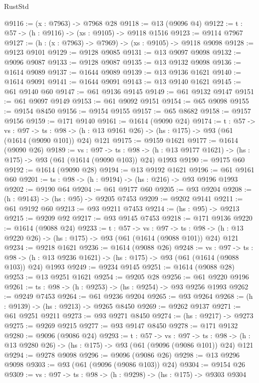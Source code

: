 \begin{lexlean}{RustStd}
\begin{coremodule}
@9116 := (x : @7963) -> @7968 @28
@9118 := @13 (@9096 @4)
@9122 := {t : @57} -> (h : @9116) -> (xs : @9105) -> @9118 @1516
@9123 := @9114 @7967
@9127 := (h : (x : @7963) -> @7969) -> (xs : @9105) -> @9118 @9098
@9128 := @9123 @9101
@9129 := @9128 @9085
@9131 := @13 @9097 @9098
@9132 := @9096 @9087
@9133 := @9128 @9087
@9135 := @13 @9132 @9098
@9136 := @1614 @9089
@9137 := @1644 @9089
@9139 := @13 @9136 @1621
@9140 := @1614 @9091
@9141 := @1644 @9091
@9143 := @13 @9140 @1621
@9145 := @61 @9140 @60
@9147 := @61 @9136 @9145
@9149 := @61 @9132 @9147
@9151 := @61 @9097 @9149
@9153 := @61 @9092 @9151
@9154 := @65 @9098
@9155 := @9154 @8450
@9156 := @9154 @9155
@9157 := @65 @8682
@9158 := @9157 @9156
@9159 := @171 @9140
@9161 := @1614 (@9090 @24)
@9174 := {t : @57} ->
  {vs : @97} ->
  {ts : @98} -> (h : @13 @9161 @26) -> (hs : @175) -> @93 (@61 (@1614 (@9090 @101)) @24) @121
@9175 := @9159 @1621
@9177 := @1614 (@9090 @26)
@9189 := {vs : @97} ->
  {ts : @98} -> (h : @13 @9177 @1621) -> (hs : @175) -> @93 (@61 (@1614 (@9090 @103)) @24) @1993
@9190 := @9175 @60
@9192 := @1614 (@9090 @28)
@9194 := @13 @9192 @1621
@9196 := @61 @9161 @60
@9201 := {ts : @98} -> (h : @9194) -> (hs : @216) -> @93 @9196 @1993
@9202 := @9190 @64
@9204 := @61 @9177 @60
@9205 := @93 @9204
@9208 := (h : @9143) -> (hs : @95) -> @9205 @7453
@9209 := @9202 @9141
@9211 := @61 @9192 @60
@9213 := @93 @9211 @7453
@9214 := (hs : @95) -> @9213
@9215 := @9209 @92
@9217 := @93 @9145 @7453
@9218 := @171 @9136
@9220 := @1614 (@9088 @24)
@9233 := {t : @57} ->
  {vs : @97} ->
  {ts : @98} -> (h : @13 @9220 @26) -> (hs : @175) -> @93 (@61 (@1614 (@9088 @101)) @24) @121
@9234 := @9218 @1621
@9236 := @1614 (@9088 @26)
@9248 := {vs : @97} ->
  {ts : @98} -> (h : @13 @9236 @1621) -> (hs : @175) -> @93 (@61 (@1614 (@9088 @103)) @24) @1993
@9249 := @9234 @9145
@9251 := @1614 (@9088 @28)
@9253 := @13 @9251 @1621
@9254 := @9205 @28
@9256 := @61 @9220 @9196
@9261 := {ts : @98} -> (h : @9253) -> (hs : @9254) -> @93 @9256 @1993
@9262 := @9249 @7453
@9264 := @61 @9236 @9204
@9265 := @93 @9264
@9268 := (h : @9139) -> (hs : @9213) -> @9265 @8450
@9269 := @9262 @9137
@9271 := @61 @9251 @9211
@9273 := @93 @9271 @8450
@9274 := (hs : @9217) -> @9273
@9275 := @9269 @9215
@9277 := @93 @9147 @8450
@9278 := @171 @9132
@9280 := @9096 (@9086 @24)
@9293 := {t : @57} ->
  {vs : @97} ->
  {ts : @98} -> (h : @13 @9280 @26) -> (hs : @175) -> @93 (@61 (@9096 (@9086 @101)) @24) @121
@9294 := @9278 @9098
@9296 := @9096 (@9086 @26)
@9298 := @13 @9296 @9098
@9303 := @93 (@61 (@9096 (@9086 @103)) @24)
@9304 := @9154 @26
@9309 := {vs : @97} -> {ts : @98} -> (h : @9298) -> (hs : @175) -> @9303 @9304

\end{coremodule}
\end{lexlean}
